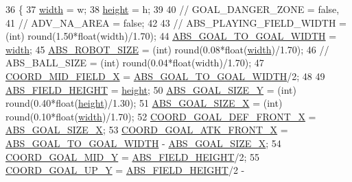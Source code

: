 \begin{DoxyCode}
36                                          \{
37     \hyperlink{namespace_c_o_n_s_t_afd10469262c8cf9aec66ca799bfea24c}{width} = w;
38     \hyperlink{namespace_c_o_n_s_t_a9805ca9eb67b8225c60697567283175d}{height} = h;
39 
40     \textcolor{comment}{// GOAL\_DANGER\_ZONE = false,}
41     \textcolor{comment}{// ADV\_NA\_AREA = false;}
42 
43     \textcolor{comment}{// ABS\_PLAYING\_FIELD\_WIDTH = (int) round(1.50*float(width)/1.70);}
44     \hyperlink{namespace_c_o_n_s_t_abe3ca2e589a94f9e273309abaa8313d4}{ABS\_GOAL\_TO\_GOAL\_WIDTH} = \hyperlink{namespace_c_o_n_s_t_afd10469262c8cf9aec66ca799bfea24c}{width};
45     \hyperlink{namespace_c_o_n_s_t_a8d0d7fe4341b9129cabd565ef16a0640}{ABS\_ROBOT\_SIZE} = (int) round(0.08*\textcolor{keywordtype}{float}(\hyperlink{namespace_c_o_n_s_t_afd10469262c8cf9aec66ca799bfea24c}{width})/1.70);
46     \textcolor{comment}{// ABS\_BALL\_SIZE = (int) round(0.04*float(width)/1.70);}
47     \hyperlink{namespace_c_o_n_s_t_ad21da2e838c0a8da29db74cba008cf46}{COORD\_MID\_FIELD\_X} = \hyperlink{namespace_c_o_n_s_t_abe3ca2e589a94f9e273309abaa8313d4}{ABS\_GOAL\_TO\_GOAL\_WIDTH}/2;
48 
49     \hyperlink{namespace_c_o_n_s_t_a42a76a781b7cd424616b37ec9d720f98}{ABS\_FIELD\_HEIGHT} = \hyperlink{namespace_c_o_n_s_t_a9805ca9eb67b8225c60697567283175d}{height};
50     \hyperlink{namespace_c_o_n_s_t_a5461381c3d71d5f77ef87d4e8c2b05df}{ABS\_GOAL\_SIZE\_Y} = (int) round(0.40*\textcolor{keywordtype}{float}(\hyperlink{namespace_c_o_n_s_t_a9805ca9eb67b8225c60697567283175d}{height})/1.30);
51     \hyperlink{namespace_c_o_n_s_t_a01f9b9486ce728d46c65c5d2fc2798d4}{ABS\_GOAL\_SIZE\_X} = (int) round(0.10*\textcolor{keywordtype}{float}(\hyperlink{namespace_c_o_n_s_t_afd10469262c8cf9aec66ca799bfea24c}{width})/1.70); 
52     \hyperlink{namespace_c_o_n_s_t_a0337e257371474864833c9d72e5295e4}{COORD\_GOAL\_DEF\_FRONT\_X} = \hyperlink{namespace_c_o_n_s_t_a01f9b9486ce728d46c65c5d2fc2798d4}{ABS\_GOAL\_SIZE\_X};
53     \hyperlink{namespace_c_o_n_s_t_a8788c5d888fd3e9d9382502aee24afee}{COORD\_GOAL\_ATK\_FRONT\_X} = \hyperlink{namespace_c_o_n_s_t_abe3ca2e589a94f9e273309abaa8313d4}{ABS\_GOAL\_TO\_GOAL\_WIDTH} - 
      \hyperlink{namespace_c_o_n_s_t_a01f9b9486ce728d46c65c5d2fc2798d4}{ABS\_GOAL\_SIZE\_X};
54     \hyperlink{namespace_c_o_n_s_t_a227a51bc8809f1391dc096eafb6b1d85}{COORD\_GOAL\_MID\_Y} = \hyperlink{namespace_c_o_n_s_t_a42a76a781b7cd424616b37ec9d720f98}{ABS\_FIELD\_HEIGHT}/2;
55     \hyperlink{namespace_c_o_n_s_t_ab1e77f62ff88d04c9aac407f4405add2}{COORD\_GOAL\_UP\_Y} = \hyperlink{namespace_c_o_n_s_t_a42a76a781b7cd424616b37ec9d720f98}{ABS\_FIELD\_HEIGHT}/2 - 

\end{DoxyCode}
